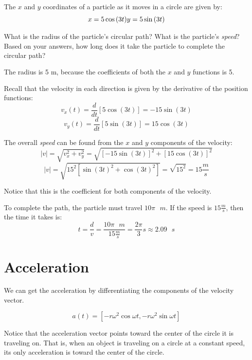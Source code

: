 \begin{Exercise} The $x$ and $y$ coordinates of a particle as it moves in a circle are given by:
$$x = 5\cos{\left( 3t \right)}\\
y = 5\sin{\left( 3t \right)}$$

What is the radius of the particle's circular path? What is the particle's \textit{speed}? Based on your answers, how long does it take the particle to complete the circular path?
\vspace{50mm}
\end{Exercise}

\begin{Answer}[ref = particle]
The radius is 5 m, because the coefficients of both the $x$ and $y$ functions is 5. 

Recall that the velocity in each direction is given by the derivative of the position functions:
$$v_x(t) = \frac{d}{dt} \left[ 5 \cos{ \left( 3t \right)} \right] = -15 \sin{ \left( 3t \right)}$$
$$v_y(t) = \frac{d}{dt} \left[ 5 \sin{ \left( 3t \right)} \right] = 15 \cos{ \left( 3t \right)}$$

The overall \textit{speed} can be found from the $x$ and $y$ components of the velocity:
$$|v| = \sqrt{v_x^2 + v_y^2} = \sqrt{\left[ -15 \sin{ \left( 3t \right) } \right]^2 + \left[ 15 \cos{ \left( 3t \right)} \right]^2}$$
$$|v| = \sqrt{15^2 \left[ \sin{ \left(3t \right)}^2 + \cos{ \left( 3t \right)}^2 \right]} = \sqrt{15^2} = 15 \frac{m}{s}$$

Notice that this is the coefficient for both components of the velocity. 

To complete the path, the particle must travel $10\pi \text{ } m$. If the speed is $15 \frac{m}{s}$, then the time it takes is:
$$t = \frac{d}{v} = \frac{10\pi \text{ } m}{15 \frac{m}{s}} = \frac{2\pi}{3} s \approx 2.09 \text{ } s$$
\end{Answer}

\section{Acceleration}

We can get the acceleration by differentiating the components of the velocity vector.

$$a(t) = \left[-r \omega^2 \cos{\omega t}, -r \omega^2 \sin{\omega t} \right]$$

Notice that the acceleration vector points toward the center of the
circle it is traveling on.  That is, when an object is traveling on a
circle at a constant speed, its only acceleration is toward the center
of the circle.

